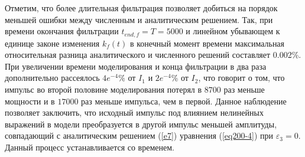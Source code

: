 \documentclass[14pt,a4paper]{extreport}
\begin{document}
			Отметим, что более длительная фильтрация позволяет добиться на порядок меньшей ошибки между численным и аналитическим решением. Так, при времени окончания фильтрации \(t_{end,f}=T=5000\) и линейном убывающем к единице законе изменения \(k_{f}\left(t\right)\) в конечный момент времени максимальная относительная разница аналитического и численного решений составляет 0.002\%. При увеличении времени моделирования и конца фильтрации в два раза дополнительно рассеялось \(4e^{-4}\%\) от \(I_{1}\) и \(2e^{-4}\%\) от \(I_{2}\), что говорит о том, что импульс во второй половине моделирования потерял в \(8700\) раз меньше мощности и в \(17000\) раз меньше импульса, чем в первой. Данное наблюдение позволяет заключить, что исходный импульс под влиянием нелинейных выражений в модели преобразуется в другой импульс меньшей амплитуды, совпадающий с аналитическим решением (\ref{e7}) уравнения (\ref{eq200-4}) при \(\varepsilon_{3}=0\). Данный процесс устанавливается со временем.
\end{document}
